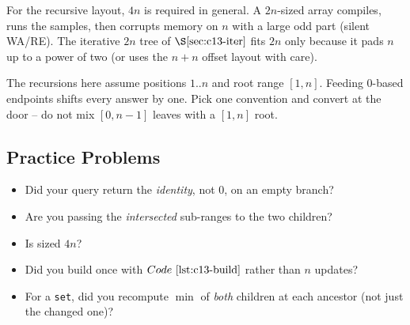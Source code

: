 \begin{warningbox}
For the recursive layout, \(4n\) is required in general.  A \(2n\)-sized array
compiles, runs the samples, then corrupts memory on \(n\) with a large odd part
(silent WA/RE).  The iterative \(2n\) tree of \(\secref{c13-iter}\) fits \(2n\)
only because it pads \(n\) up to a power of two (or uses the \(n{+}n\) offset
layout with care).
\end{warningbox}

\begin{warningbox}
The recursions here assume positions \(1..n\) and root range \([1,n]\).  Feeding
0-based endpoints shifts every answer by one.  Pick one convention and convert
at the door -- do not mix \([0,n{-}1]\) leaves with a \([1,n]\) root.
\end{warningbox}

\subsection{Practice Problems}

\begin{stuckbox}
\begin{itemize}[nosep,leftmargin=1.4em]
  \item Did your query return the \emph{identity}, not \(0\), on an empty branch?
  \item Are you passing the \emph{intersected} sub-ranges to the two children?
  \item Is  sized \(4n\)?
  \item Did you build once with \(\coderef{c13-build}\) rather than \(n\) updates?
  \item For a \texttt{set}, did you recompute \(\min\) of \emph{both} children
        at each ancestor (not just the changed one)?
\end{itemize}
\end{stuckbox}

